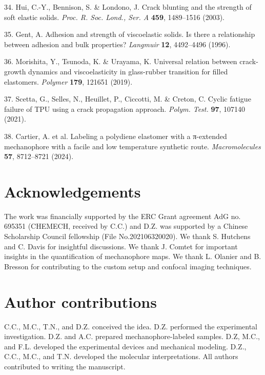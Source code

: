 \documentclass{article}
\begin{document}
\begin{hangpars}
34. Hui, C.-Y., Bennison, S. \& Londono, J. Crack blunting and the strength of soft elastic solids. \emph{Proc. R. Soc. Lond., Ser. A} \textbf{459}, 1489–1516 (2003).

35. Gent, A. Adhesion and strength of viscoelastic solids. Is there a relationship between adhesion and bulk properties? \emph{Langmuir} \textbf{12}, 4492–4496 (1996).

36. Morishita, Y., Tsunoda, K. \& Urayama, K. Universal relation between crack-growth dynamics and viscoelasticity in glass-rubber transition for filled elastomers. \emph{Polymer} \textbf{179}, 121651 (2019).

37. Scetta, G., Selles, N., Heuillet, P., Ciccotti, M. \& Creton, C. Cyclic fatigue failure of TPU using a crack propagation approach. \emph{Polym. Test.} \textbf{97}, 107140 (2021).

38. Cartier, A. et al. Labeling a polydiene elastomer with a π-extended mechanophore with a facile and low temperature synthetic route. \emph{Macromolecules} \textbf{57}, 8712–8721 (2024).
\end{hangpars}

\section*{Acknowledgements}

The work was financially supported by the ERC Grant agreement AdG no. 695351 (CHEMECH, received by C.C.) and D.Z. was supported by a Chinese Scholarship Council fellowship (File No.202106320020). We thank S. Hutchens and C. Davis for insightful discussions. We thank J. Comtet for important insights in the quantification of mechanophore maps. We thank L. Olanier and B. Bresson for contributing to the custom setup and confocal imaging techniques.

\section*{Author contributions}

C.C., M.C., T.N., and D.Z. conceived the idea. D.Z. performed the experimental investigation. D.Z. and A.C. prepared mechanophore-labeled samples. D.Z, M.C., and F.L. developed the experimental devices and mechanical modeling. D.Z., C.C., M.C., and T.N. developed the molecular interpretations. All authors contributed to writing the manuscript.
\end{document}
